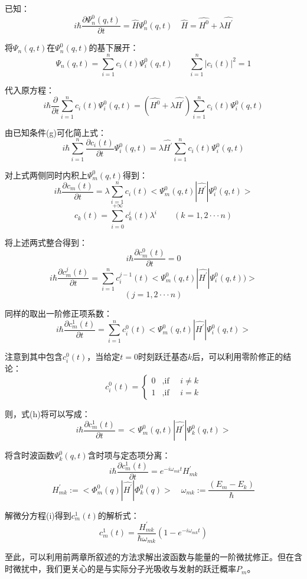 已知：
\[i \hbar \frac{\partial \varPsi_n^0(q,t)}{\partial t}=\hat{H} \varPsi_n^0(q,t)\quad \hat{H}=\hat{H^0}+\lambda\hat{H^{'}}\tag{g}\]

将$\varPsi_n(q,t)$在$\varPsi_n^0(q,t)$的基下展开：
\[\varPsi_n(q,t)=\sum_{i=1}^nc_i(t)\varPsi_i^0(q,t) \qquad \sum_{i=1}^n|c_i(t)|^2=1\]

代入原方程：
\[i \hbar \frac{\partial}{\partial t}\sum_{i=1}^nc_i(t)\varPsi_i^0(q,t)=(\hat{H^0}+\lambda\hat{H^{'}}) \sum_{i=1}^nc_i(t)\varPsi_i^0(q,t)\]

由已知条件(g)可化简上式：
\[i \hbar \sum_{i=1}^n\frac{\partial c_i(t)}{\partial t}\varPsi_i^0(q,t)=\lambda\hat{H^{'}} \sum_{i=1}^nc_i(t)\varPsi_i^0(q,t)\]

对上式两侧同时内积上$\varPsi_m^0(q,t)$得到：
\[i \hbar \frac{\partial c_m(t)}{\partial t}=\lambda\sum_{i=1}^nc_i(t)<\varPsi_m^0(q,t)|\hat{H^{'}}|\varPsi_i^0(q,t)>\]
\[c_k(t)=\sum_{i=0}^{+\infty}c_k^i(t)\lambda^i \qquad (k=1,2 \cdot\cdot\cdot n)\]

将上述两式整合得到：
\[i \hbar \frac{\partial c_m^0(t)}{\partial t}=0\]
\[i \hbar \frac{\partial c_m^j(t)}{\partial t}=\sum_{i=1}^nc_i^{j-1}(t)<\varPsi_m^0(q,t)|\hat{H^{'}}|\varPsi_i^0(q,t))>\]
\[(j=1,2 \cdot\cdot\cdot n)\]

同样的取出一阶修正项系数：
\[i \hbar \frac{\partial c_m^1(t)}{\partial t}=\sum_{i=1}^nc_i^0(t)<\varPsi_m^0(q,t)|\hat{H^{'}}|\varPsi_i^0(q,t)> \tag{h}\]

注意到其中包含$c_i^0(t)$，当给定$t=0$时刻跃迁基态$k$后，可以利用零阶修正的结论：
\[c_i^0(t) = \left\{
\begin{array}{rl}
0 & \text{,if  }\quad i \neq k\\
1 & \text{,if  }\quad i=k
\end{array} \right. \]

则，式(h)将可以写成：
\[i \hbar \frac{\partial c_m^1(t)}{\partial t}=<\varPsi_m^0(q,t)|\hat{H^{'}}|\varPsi_k^0(q,t)>\]

将含时波函数$\varPsi_k^0(q,t)$含时项与定态项分离：
\[i \hbar \frac{\partial c_m^1(t)}{\partial t}=e^{-i \omega_{mk} t}H^{'}_{mk} \tag{i}\]
\[H^{'}_{mk}:=<\varPhi_m^0(q)|\hat{H^{'}}|\varPhi_k^0(q)> \quad \omega_{mk}:=\frac{(E_m-E_k)}{\hbar}\]

解微分方程(i)得到$c_m^1(t)$的解析式：
\[c_m^1(t)=\frac{H^{'}_{mk}}{\hbar \omega_{mk}}(1-e^{-i \omega_{mk} t})\]

至此，可以利用前两章所叙述的方法求解出波函数与能量的一阶微扰修正。但在含时微扰中，我们更关心的是与实际分子光吸收与发射的跃迁概率$P_m$。


